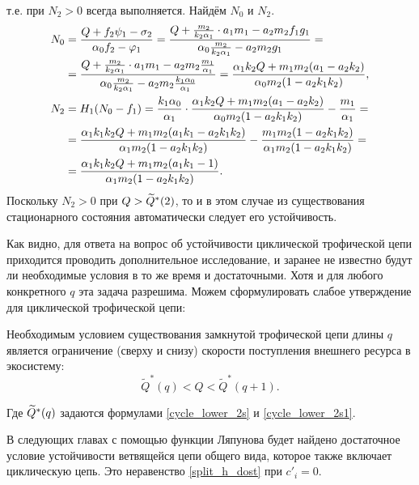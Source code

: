 \begin{enumerate}
т.е. при \(N_2 > 0\) всегда выполняется. Найдём \(N_0\) и \( N_2\). 
\begin{equation*}
    \begin{split}
        N_0 &= \frac{Q + f_2 \psi_1 - \sigma_2}{\alpha_0 f_2 - \varphi_1} = \frac{Q + \frac{m_2}{k_2 \alpha_1} \cdot a_1 m_1 - a_2 m_2 f_1 g_1}{\alpha_0 \frac{m_2}{k_2 \alpha_1} - a_2 m_2 g_1} =\\
        & = \frac{Q + \frac{m_2}{k_2 \alpha_1} \cdot a_1 m_1 - a_2 m_2 \frac{m_1}{\alpha_1}}{\alpha_0 \frac{m_2}{k_2 \alpha_1} - a_2 m_2 \frac{k_1 \alpha_0}{\alpha_1}} = 
        \frac{\alpha_1 k_2 Q +  m_1 m_2 ( a_1- a_2 k_2 )}{\alpha_0 m_2 ( 1- a_2 k_1 k_2 ) }, \\
        N_2 &= H_1 (N_0 - f_1) = \frac{k_1 \alpha_0}{\alpha_1} \cdot \frac{\alpha_1 k_2 Q +  m_1 m_2 ( a_1- a_2 k_2 )}{\alpha_0 m_2 ( 1 - a_2 k_1 k_2 ) } - \frac{m_1}{\alpha_1} =\\
        & = \frac{\alpha_1 k_1 k_2 Q + m_1 m_2 ( a_1 k_1 - a_2 k_1 k_2 )}{\alpha_1 m_2 ( 1- a_2 k_1 k_2 ) } - \frac{m_1 m_2 ( 1- a_2 k_1 k_2 )}{\alpha_1 m_2 ( 1- a_2 k_1 k_2 )} = \\
        & = \frac{\alpha_1 k_1 k_2 Q + m_1 m_2 ( a_1 k_1 - 1 )}{\alpha_1 m_2 ( 1- a_2 k_1 k_2 ) }.
    \end{split}
\end{equation*}
Поскольку \( N_2 > 0 \) при \( Q > \widetilde{Q}^*(2)\), то и в этом случае из существования стационарного состояния автоматически следует его устойчивость.
\end{enumerate}

Как видно, для ответа на вопрос об устойчивости циклической трофической цепи приходится проводить дополнительное исследование, и заранее не известно будут ли необходимые условия в то же время и достаточными. Хотя и для любого конкретного \(q\) эта задача разрешима. Можем сформулировать слабое утверждение для циклической трофической цепи:
\begin{corollary}
    Необходимым условием существования замкнутой трофической цепи длины \(q\) является ограничение (сверху и снизу) скорости поступления внешнего ресурса в экосистему:
    \begin{equation}
        \widetilde{Q}^*(q) < Q < \widetilde{Q}^*(q+1).
    \end{equation}
\end{corollary}
Где \(\widetilde{Q}^*(q)\) задаются формулами \eqref{cycle_lower_2s} и \eqref{cycle_lower_2s1}.

В следующих главах с помощью функции Ляпунова будет найдено достаточное условие устойчивости ветвящейся цепи общего вида, которое также включает циклическую цепь. Это неравенство \eqref{split_h_dost} при \(c'_i = 0\).

